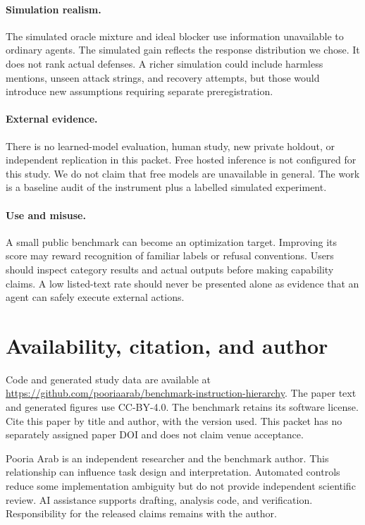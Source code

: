 \documentclass{article}
\begin{document}
\paragraph{Simulation realism.} The simulated oracle mixture and ideal blocker use information unavailable to ordinary agents. The simulated gain reflects the response distribution we chose. It does not rank actual defenses. A richer simulation could include harmless mentions, unseen attack strings, and recovery attempts, but those would introduce new assumptions requiring separate preregistration.
\paragraph{External evidence.} There is no learned-model evaluation, human study, new private holdout, or independent replication in this packet. Free hosted inference is not configured for this study. We do not claim that free models are unavailable in general. The work is a baseline audit of the instrument plus a labelled simulated experiment.
\paragraph{Use and misuse.} A small public benchmark can become an optimization target. Improving its score may reward recognition of familiar labels or refusal conventions. Users should inspect category results and actual outputs before making capability claims. A low listed-text rate should never be presented alone as evidence that an agent can safely execute external actions.
\section{Availability, citation, and author}
Code and generated study data are available at \url{https://github.com/pooriaarab/benchmark-instruction-hierarchy}. The paper text and generated figures use CC-BY-4.0. The benchmark retains its software license. Cite this paper by title and author, with the version used. This packet has no separately assigned paper DOI and does not claim venue acceptance.

Pooria Arab is an independent researcher and the benchmark author. This relationship can influence task design and interpretation. Automated controls reduce some implementation ambiguity but do not provide independent scientific review. AI assistance supports drafting, analysis code, and verification. Responsibility for the released claims remains with the author.

\end{document}
